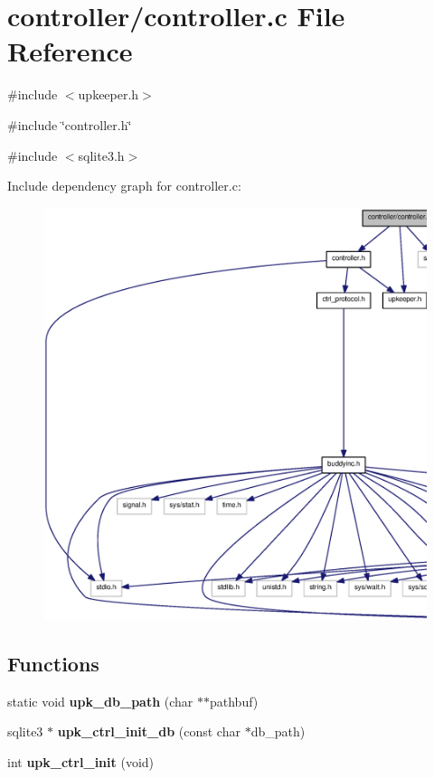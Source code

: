 \section{controller/controller.c File Reference}
\label{controller_2controller_8c}
{\ttfamily \#include $<$upkeeper.h$>$}\par
{\ttfamily \#include \char`\"{}controller.h\char`\"{}}\par
{\ttfamily \#include $<$sqlite3.h$>$}\par
Include dependency graph for controller.c:
\nopagebreak
\begin{figure}[H]
\begin{center}
\leavevmode
\includegraphics[width=400pt]{controller_2controller_8c__incl}
\end{center}
\end{figure}
\subsection*{Functions}
\begin{DoxyCompactItemize}
\item 
static void {\bf upk\_\-db\_\-path} (char $\ast$$\ast$pathbuf)
\item 
sqlite3 $\ast$ {\bf upk\_\-ctrl\_\-init\_\-db} (const char $\ast$db\_\-path)
\item 
int {\bf upk\_\-ctrl\_\-init} (void)
\end{DoxyCompactItemize}


